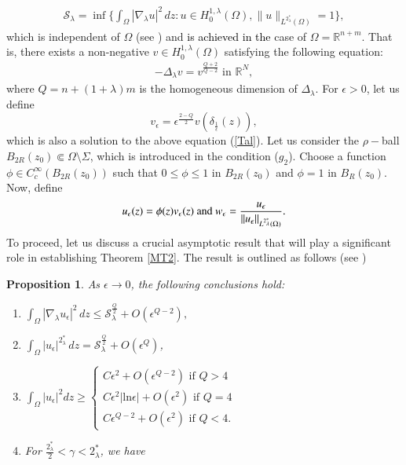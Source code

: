 \documentclass[12pt, notitlepage]{article}
\def\R{\mathbb{R}}
\newtheorem{prop}[theorem]{Proposition}
\begin{document}
{{\begin{align*}
    \mathcal{S}_\lambda=\inf\Big\{\int_\Omega |\nabla_\lambda u|^2\, dz: u\in H^{1,\lambda}_0(\Omega), \|u\|_{L^{2^*_\lambda}(\Omega )}=1\Big\},
\end{align*}}
which is independent of $\Omega$ (see \cite[Proposition 3.3]{PL}) and \textcolor{black}{is achieved in the} case of $\Omega=\R^{n+m}$. That is, there exists a non-negative $v\in H^{1,\lambda}_0(\Omega)$ satisfying the following equation:
\begin{align}\label{Tal}
    -\Delta_\lambda v=v^\frac{Q+2}{Q-2} \text{ in } \R^N,
\end{align}
where $Q=n+(1+\lambda)m$ is the homogeneous dimension of $\Delta_\lambda$.  For $\epsilon>0$, let us define $$v_\epsilon=\epsilon^\frac{2-Q}{2}v(\delta_{\frac{1}{\epsilon}}(z)),$$ which is also a solution to the above equation (\ref{Tal}). Let us consider the $\rho-$ball $B_{2R}(z_0)\Subset\Omega\setminus\Sigma$, which is introduced in the condition ($g_2$). Choose a function $\phi\in C^\infty_c(B_{2R}(z_0))$ such that $0\leq \phi\leq 1$ in $B_{2R}(z_0)$ and $\phi=1$ in $B_R(z_0)$. Now, define
\begin{align}\label{Asy}
    u_\epsilon(z)=\phi(z)v_\epsilon(z) \text{ and } w_\epsilon=\frac{u_\epsilon}{\|u_\epsilon\|_{\textcolor{black}{L^{2^*_\lambda}(\Omega)}}}.
\end{align}
To proceed, let us discuss a crucial asymptotic result that will play a significant role in establishing Theorem \ref{MT2}. The result is outlined as follows (see \cite{PL})
\begin{prop}\label{Pro1}
    As $\epsilon\to 0$, the following conclusions hold:
    \begin{enumerate}
        \item[(i)]$\int_\Omega |\nabla_\lambda u_\epsilon|^2\, dz\leq \mathcal{S}_\lambda^\frac{Q}{2}+O(\epsilon^{Q-2}),$
        \item [(ii)]$\int_\Omega |u_\epsilon|^{2^*_\lambda}\, dz=\mathcal{S}_\lambda^\frac{Q}{2}+O(\epsilon^Q)$,
        \item[(iii)] $\int_\Omega |u_\epsilon|^2 dz\geq\begin{cases}
            C\epsilon^2+O(\epsilon^{Q-2}) \text{ if } Q>4\\
          C\epsilon^2|\mathrm{ln}\epsilon|+O(\epsilon^2) \text{ if } Q=4\\
          C\epsilon^{Q-2}+O(\epsilon^2) \text{ if } Q<4.
        \end{cases}$
        \item[(iv)]For $\frac{2^*_\lambda}{2}<\gamma<2^*_\lambda$, we have

\end{enumerate}
\end{prop}}
\end{document}
